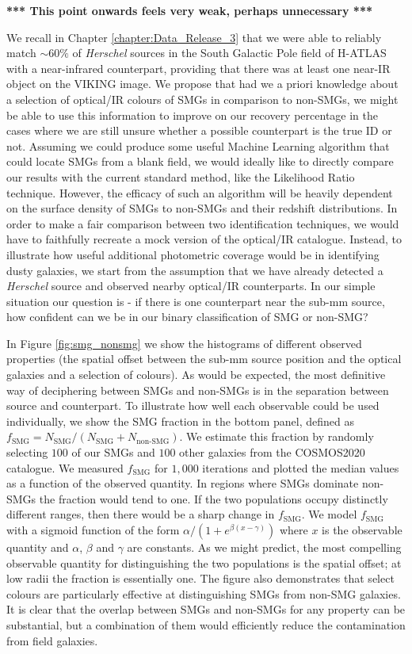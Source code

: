 \textbf{*** This point onwards feels very weak, perhaps unnecessary ***}

We recall in Chapter \ref{chapter:Data_Release_3} that we were able to reliably match $\sim 60\%$ of \textit{Herschel} sources in the South Galactic Pole field of H-ATLAS with a near-infrared counterpart, providing that there was at least one near-IR object on the VIKING image. We propose that had we a priori knowledge about a selection of optical/IR colours of SMGs in comparison to non-SMGs, we might be able to use this information to improve on our recovery percentage in the cases where we are still unsure whether a possible counterpart is the true ID or not. Assuming we could produce some useful Machine Learning algorithm that could locate SMGs from a blank field, we would ideally like to directly compare our results with the current standard method, like the Likelihood Ratio technique. However, the efficacy of such an algorithm will be heavily dependent on the surface density of SMGs to non-SMGs and their redshift distributions. In order to make a fair comparison between two identification techniques, we would have to faithfully recreate a mock version of the optical/IR catalogue. Instead, to illustrate how useful additional photometric coverage would be in identifying dusty galaxies, we start from the assumption that we have already detected a \textit{Herschel} source and observed nearby optical/IR counterparts. In our simple situation our question is - if there is one counterpart near the sub-mm source, how confident can we be in our binary classification of SMG or non-SMG?

In Figure \ref{fig:smg_nonsmg} we show the histograms of different observed properties (the spatial offset between the sub-mm source position and the optical galaxies and a selection of colours). As would be expected, the most definitive way of deciphering between SMGs and non-SMGs is in the separation between source and counterpart. To illustrate how well each observable could be used individually, we show the SMG fraction in the bottom panel, defined as $f_\textrm{SMG} = N_\textrm{SMG}/(N_\textrm{SMG}+N_\textrm{non-SMG})$. We estimate this fraction by randomly selecting $100$ of our SMGs and $100$ other galaxies from the COSMOS2020 catalogue. We measured $f_\textrm{SMG}$ for $1,000$ iterations and plotted the median values as a function of the observed quantity. In regions where SMGs dominate non-SMGs the fraction would tend to one. If the two populations occupy distinctly different ranges, then there would be a sharp change in $f_\textrm{SMG}$. We model $f_\textrm{SMG}$ with a sigmoid function of the form $\alpha/(1+e^{\beta(x-\gamma)})$ where $x$ is the observable quantity and $\alpha$, $\beta$ and $\gamma$ are constants. As we might predict, the most compelling observable quantity for distinguishing the two populations is the spatial offset; at low radii the fraction is essentially one. The figure also demonstrates that select colours are particularly effective at distinguishing SMGs from non-SMG galaxies. It is clear that the overlap between SMGs and non-SMGs for any property can be substantial, but a combination of them would efficiently reduce the contamination from field galaxies.

